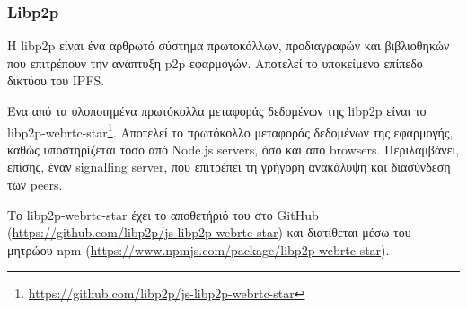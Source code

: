 \subsubsection{Libp2p} \label{subsection:4-2-4-3-libp2p}


Η libp2p είναι ένα αρθρωτό σύστημα πρωτοκόλλων, προδιαγραφών και βιβλιοθηκών που επιτρέπουν την ανάπτυξη p2p εφαρμογών. Αποτελεί το υποκείμενο επίπεδο δικτύου του IPFS.\cite{2.7-ipfs-docs}

Ένα από τα υλοποιημένα πρωτόκολλα μεταφοράς δεδομένων της libp2p είναι το libp2p-webrtc-star\footnote{\url{https://github.com/libp2p/js-libp2p-webrtc-star}}. Αποτελεί το πρωτόκολλο μεταφοράς δεδομένων της εφαρμογής, καθώς υποστηρίζεται τόσο από Node.js servers, όσο και από browsers. Περιλαμβάνει, επίσης, έναν signalling server, που επιτρέπει τη γρήγορη ανακάλυψη και διασύνδεση των peers.

Το libp2p-webrtc-star έχει το αποθετήριό του στο GitHub (\url{https://github.com/libp2p/js-libp2p-webrtc-star}) και διατίθεται μέσω του μητρώου npm (\url{https://www.npmjs.com/package/libp2p-webrtc-star}).
